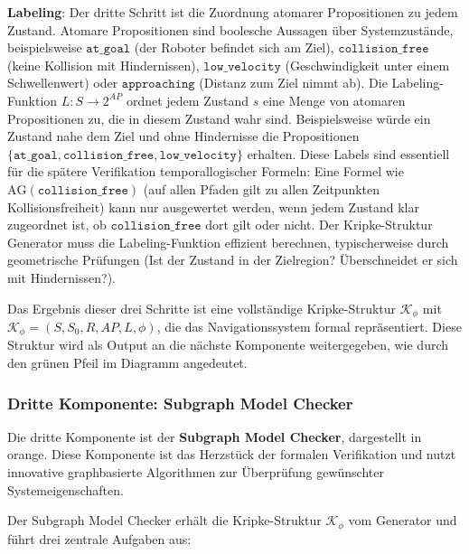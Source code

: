﻿\documentclass[a4paper,12pt]{article}
\theoremstyle{definition}
\begin{document}
\textbf{Labeling}: Der dritte Schritt ist die Zuordnung atomarer Propositionen zu jedem Zustand. Atomare Propositionen sind boolesche Aussagen über Systemzustände, beispielsweise $\texttt{at\_goal}$ (der Roboter befindet sich am Ziel), $\texttt{collision\_free}$ (keine Kollision mit Hindernissen), $\texttt{low\_velocity}$ (Geschwindigkeit unter einem Schwellenwert) oder $\texttt{approaching}$ (Distanz zum Ziel nimmt ab). Die Labeling-Funktion $L: S \to 2^{AP}$ ordnet jedem Zustand $s$ eine Menge von atomaren Propositionen zu, die in diesem Zustand wahr sind. Beispielsweise würde ein Zustand nahe dem Ziel und ohne Hindernisse die Propositionen $\{\texttt{at\_goal}, \texttt{collision\_free}, \texttt{low\_velocity}\}$ erhalten. Diese Labels sind essentiell für die spätere Verifikation temporallogischer Formeln: Eine Formel wie $\text{AG}(\texttt{collision\_free})$ (auf allen Pfaden gilt zu allen Zeitpunkten Kollisionsfreiheit) kann nur ausgewertet werden, wenn jedem Zustand klar zugeordnet ist, ob $\texttt{collision\_free}$ dort gilt oder nicht. Der Kripke-Struktur Generator muss die Labeling-Funktion effizient berechnen, typischerweise durch geometrische Prüfungen (Ist der Zustand in der Zielregion? Überschneidet er sich mit Hindernissen?).

Das Ergebnis dieser drei Schritte ist eine vollständige Kripke-Struktur $\mathcal{K}_\phi$ mit $\mathcal{K}_\phi = (S, S_0, R, AP, L, \phi)$, die das Navigationssystem formal repräsentiert. Diese Struktur wird als Output an die nächste Komponente weitergegeben, wie durch den grünen Pfeil im Diagramm angedeutet.

\subsubsection{Dritte Komponente: Subgraph Model Checker}

Die dritte Komponente ist der \textbf{Subgraph Model Checker}, dargestellt in orange. Diese Komponente ist das Herzstück der formalen Verifikation und nutzt innovative graphbasierte Algorithmen zur Überprüfung gewünschter Systemeigenschaften.

Der Subgraph Model Checker erhält die Kripke-Struktur $\mathcal{K}_\phi$ vom Generator und führt drei zentrale Aufgaben aus:
\end{document}

